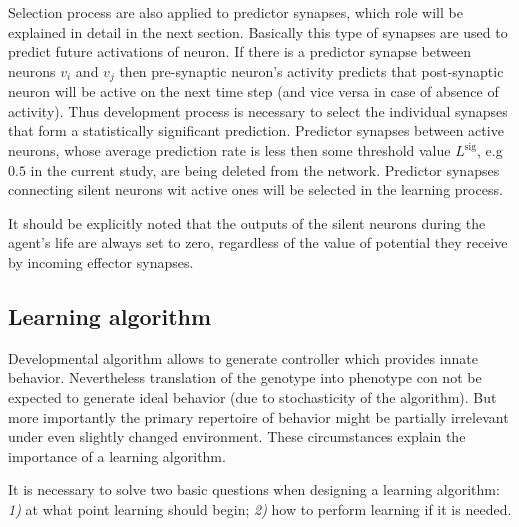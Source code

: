 \documentclass[letterpaper]{article}
\begin{document}
Selection process are also applied to predictor synapses, which role will be explained in detail in the next section. Basically this type of synapses are used to predict future activations of neuron. If there is a predictor synapse between neurons $v_{i}$ and $v_{j}$ then pre-synaptic neuron's activity predicts that post-synaptic neuron will be active on the next time step (and vice versa in case of absence of activity). Thus development process is necessary to select the individual synapses that form a statistically significant prediction. Predictor synapses between active neurons, whose average prediction rate is less then some threshold value $L^{\mathrm{sig}}$, e.g $0.5$ in the current study, are being deleted from the network. Predictor synapses connecting silent neurons wit active ones will be selected in the learning process. 

It should be explicitly noted that the outputs of the silent neurons during the agent's life are always set to zero, regardless of the value of potential they receive by incoming effector synapses.     

\subsection{Learning algorithm} 

Developmental algorithm allows to generate controller which provides innate behavior. Nevertheless translation of the genotype into phenotype con not be expected to generate ideal behavior (due to stochasticity of the algorithm). But more importantly the primary repertoire of behavior might be partially irrelevant under even slightly changed environment. These circumstances explain the importance of a learning algorithm.

It is necessary to solve two basic questions when designing a learning algorithm: {\em 1)} at what point learning should begin; {\em 2)} how to perform learning if it is needed. 
\end{document}
